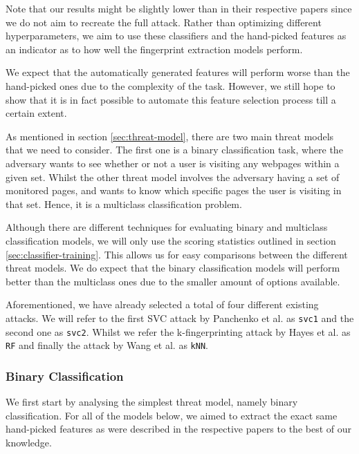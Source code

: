 Note that our results might be slightly lower than in their respective papers since we do not aim to recreate the full attack.
Rather than optimizing different hyperparameters, we aim to use these classifiers and the hand-picked features as an indicator as to how well the fingerprint extraction models perform.

We expect that the automatically generated features will perform worse than the hand-picked ones due to the complexity of the task.
However, we still hope to show that it is in fact possible to automate this feature selection process till a certain extent.

As mentioned in section \ref{sec:threat-model}, there are two main threat models that we need to consider.
The first one is a binary classification task, where the adversary wants to see whether or not a user is visiting any webpages within a given set.
Whilst the other threat model involves the adversary having a set of monitored pages, and wants to know which specific pages the user is visiting in that set.
Hence, it is a multiclass classification problem.

Although there are different techniques for evaluating binary and multiclass classification models, we will only use the scoring statistics outlined in section \ref{sec:classifier-training}.
This allows us for easy comparisons between the different threat models.
We do expect that the binary classification models will perform better than the multiclass ones due to the smaller amount of options available.

Aforementioned, we have already selected a total of four different existing attacks.
We will refer to the first SVC attack by Panchenko et al. \cite{panchenko1} as \texttt{svc1} and the second one \cite{panchenko2} as \texttt{svc2}.
Whilst we refer the k-fingerprinting attack by Hayes et al. \cite{kfingerprinting} as \texttt{RF} and finally the attack by Wang et al. \cite{wang_cai_johnson_nithyanand_goldberg_2014} as \texttt{kNN}.

\subsubsection{Binary Classification}

We first start by analysing the simplest threat model, namely binary classification.
For all of the models below, we aimed to extract the exact same hand-picked features as were described in the respective papers to the best of our knowledge.

